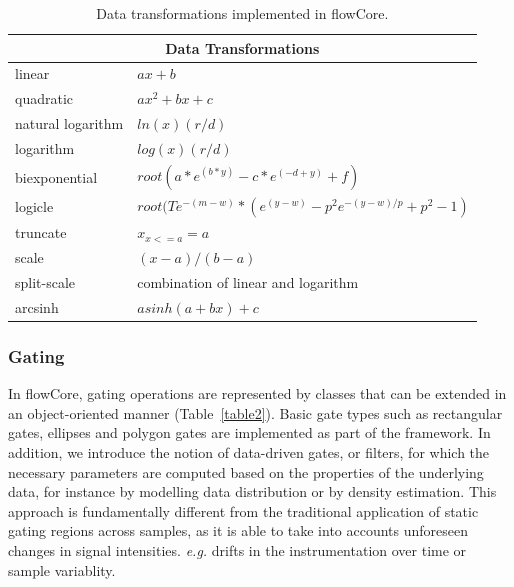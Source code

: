 \documentclass[12pt]{article}
\newcommand{\Rpackage}[1]{{\textsf{#1}}}
\begin{document}
\begin{table}[ht]
\begin{center}
\begin{tabular}{|l|l|}
\hline
\multicolumn{2}{|c|}{Data Transformations} \\
\hline
linear & $ax + b$ \\
quadratic & $ax^2 + bx + c$ \\
natural logarithm & $ln(x)(r/d)$ \\
logarithm & $log(x)(r/d)$ \\
biexponential & $root(a*e^{(b*y)}-c*e^{(-d+y)}+f)$ \\
logicle& $root(Te^{-(m-w)}*(e^{(y-w)}-p^2e^{-(y-w)/p}+p^2-1)$ \\
truncate & $x_{x<=a} = a$ \\
scale & $(x-a)/(b-a)$ \\
split-scale & combination of linear and logarithm \\
arcsinh & $asinh(a + bx)+c$ \\
\hline
\end{tabular}
\caption{\label{table1}Data transformations implemented in
  \Rpackage{flowCore}.}
\end{center}
\end{table}

\subsubsection*{Gating}

In \Rpackage{flowCore}, gating operations are represented by classes
that can be extended in an object-oriented manner
(Table~\ref{table2}). Basic gate types such as rectangular gates,
ellipses and polygon gates are implemented as part of the
framework. In addition, we introduce the notion of data-driven gates,
or filters, for which the necessary parameters are computed based on
the properties of the underlying data, for instance by modelling data
distribution or by density estimation. This approach is fundamentally
different from the traditional application of static gating regions
across samples, as it is able to take into accounts unforeseen changes
in signal intensities. \textit{e.g.} drifts in the instrumentation
over time or sample variablity.
\end{document}
